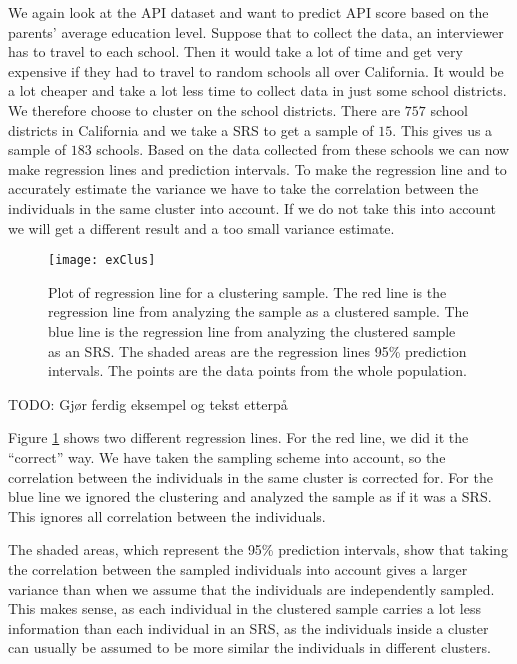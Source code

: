 \documentclass{article}
\begin{document}
\begin{example}
  We again look at the API dataset and want to predict API score based on
  the parents' average education level. Suppose that to collect the data, an
  interviewer has to travel to each school. Then it would take a lot of time and
  get very expensive if they had to travel to random schools all over
  California. It would be a lot cheaper and take a lot less time to
  collect data in just some school districts. We therefore choose to cluster
  on the school districts. There are \(757\) school districts in California and we take a SRS to
  get a sample of \(15\). This gives us a sample of \(183\) schools. Based on
  the data collected from these schools we can now make regression lines and
  prediction intervals.
  To make the regression line and to accurately estimate the variance we have to
  take the correlation between the individuals in the same cluster into account.
  If we do not take this into account we will get a different result and a too
  small variance estimate.

  \begin{figure}
    \centering
    \texttt{[image: exClus]}

    \caption{Plot of regression line for a clustering sample. The red line is
      the regression line from analyzing the sample as a clustered sample. The
      blue line is the regression line from analyzing the clustered sample as an
    SRS. The shaded areas are the regression lines 95\% prediction intervals.
    The points are the data points from the whole population.}

    \label{fig:exClus}
  \end{figure}

  TODO: Gjør ferdig eksempel og tekst etterpå

  Figure \ref{fig:exClus} shows two different regression lines. For the red line, we did it the ``correct'' way. We have taken
  the sampling scheme into account, so the correlation between the individuals
  in the same cluster is corrected for. For the blue line we ignored the
  clustering and analyzed the sample as if it was a SRS. This ignores all
  correlation between the individuals.

  The shaded areas, which represent the 95\% prediction intervals, show that
  taking the correlation between the sampled individuals into account gives a
  larger variance than when we assume that the individuals are independently sampled.
  This makes sense, as each
  individual in the clustered sample carries a lot less information than each
  individual in an SRS, as the individuals inside a cluster can usually be
  assumed to be more similar the individuals in different clusters.


\end{example}
\end{document}
